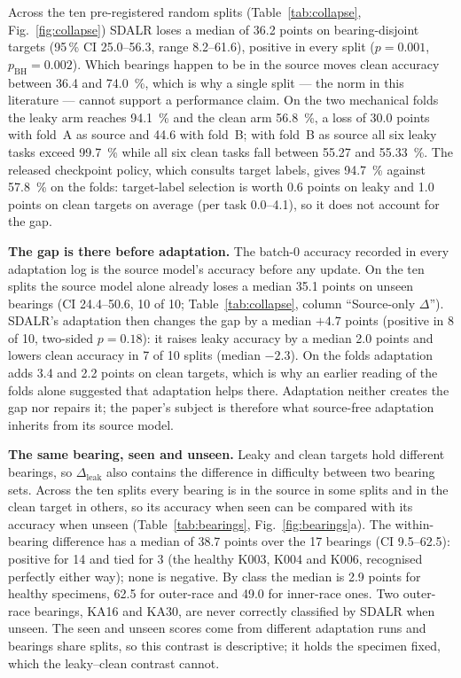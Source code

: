 Across the ten pre-registered random splits (Table~\ref{tab:collapse}, Fig.~\ref{fig:collapse}) SDALR loses a median of 36.2
points on bearing-disjoint targets (95\,\% CI 25.0--56.3, range 8.2--61.6), positive in every split ($p=0.001$,
$p_{\mathrm{BH}}=0.002$). Which bearings happen to be in the source moves clean accuracy between \SI{36.4}{} and
\SI{74.0}{\percent}, which is why a single split --- the norm in this literature --- cannot support a performance claim. On
the two mechanical folds the leaky arm reaches \SI{94.1}{\percent} and the clean arm \SI{56.8}{\percent}, a loss of 30.0
points with fold~A as source and 44.6 with fold~B; with fold~B as source all six leaky tasks exceed \SI{99.7}{\percent} while
all six clean tasks fall between \SI{55.27}{} and \SI{55.33}{\percent}. The released checkpoint policy, which consults target
labels, gives \SI{94.7}{\percent} against \SI{57.8}{\percent} on the folds: target-label selection is worth 0.6 points on leaky
and 1.0 points on clean targets on average (per task 0.0--4.1), so it does not account for the gap.

\textbf{The gap is there before adaptation.} The batch-0 accuracy recorded in every adaptation log is the source model's
accuracy before any update. On the ten splits the source model alone already loses a median 35.1 points on unseen bearings
(CI 24.4--50.6, 10 of 10; Table~\ref{tab:collapse}, column ``Source-only $\Delta$''). SDALR's adaptation then changes the gap
by a median $+4.7$ points (positive in 8 of 10, two-sided $p = 0.18$): it raises leaky accuracy by a median 2.0 points and
lowers clean accuracy in 7 of 10 splits (median $-2.3$). On the folds adaptation adds 3.4 and 2.2 points on clean targets,
which is why an earlier reading of the folds alone suggested that adaptation helps there. Adaptation neither creates the
gap nor repairs it; the paper's subject is therefore what source-free adaptation inherits from its source model.

\textbf{The same bearing, seen and unseen.} Leaky and clean targets hold different bearings, so $\Delta_{\mathrm{leak}}$ also
contains the difference in difficulty between two bearing sets. Across the ten splits every bearing is in the source in some
splits and in the clean target in others, so its accuracy when seen can be compared with its accuracy when unseen
(Table~\ref{tab:bearings}, Fig.~\ref{fig:bearings}a). The within-bearing difference has a median of 38.7 points over the 17
bearings (CI 9.5--62.5): positive for 14 and tied for 3 (the healthy K003, K004 and K006, recognised perfectly either way); none is
negative. By class the median is 2.9 points for healthy specimens, 62.5 for outer-race and 49.0 for inner-race ones. Two
outer-race bearings, KA16 and KA30, are never correctly classified by SDALR when unseen. The seen and unseen scores come from
different adaptation runs and bearings share splits, so this contrast is descriptive; it holds the specimen fixed, which
the leaky--clean contrast cannot.

